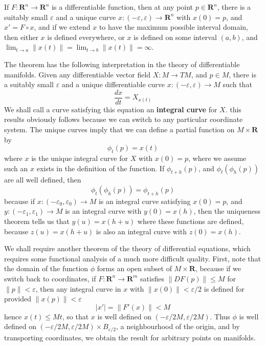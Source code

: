 \begin{theorem}
    If $F: \mathbf{R}^n \to \mathbf{R}^n$ is a differentiable function, then at any point $p \in \mathbf{R}^n$, there is a suitably small $\varepsilon$ and a unique curve $x: (-\varepsilon, \varepsilon) \to \mathbf{R}^n$ with $x(0) = p$, and $x' = F \circ x$, and if we extend $x$ to have the maximum possible interval domain, then either $x$ is defined everywhere, or $x$ is defined on some interval $(a,b)$, and $\lim_{t \to a} \| x(t) \| = \lim_{t \to b} \| x(t) \| = \infty$.
\end{theorem}

The theorem has the following interpretation in the theory of differentiable manifolds. Given any differentiable vector field $X: M \to TM$, and $p \in M$, there is a suitably small $\varepsilon$ and a unique differentiable curve $x: (-\varepsilon,\varepsilon) \to M$ such that
%
\[ \frac{dx}{dt} = X_{x(t)} \]
%
We shall call a curve satisfying this equation an {\bf integral curve} for $X$. this results obviously follows because we can switch to any particular coordinate system. The unique curves imply that we can define a partial function on $M \times \mathbf{R}$ by
%
\[ \phi_t(p) = x(t) \]
%
where $x$ is the unique integral curve for $X$ with $x(0) = p$, where we assume such an $x$ exists in the definition of the function. If $\phi_{t+h}(p)$, and $\phi_t(\phi_h(p))$ are all well defined, then
%
\[ \phi_t(\phi_h(p)) = \phi_{t + h}(p) \]
%
because if $x: (-\varepsilon_0,\varepsilon_0) \to M$ is an integral curve satisfying $x(0) = p$, and $y: (-\varepsilon_1, \varepsilon_1) \to M$ is an integral curve with $y(0) = x(h)$, then the uniqueness theorem tells us that $y(u) = x(h + u)$ where these functions are defined, because $z(u) = x(h + u)$ is also an integral curve with $z(0) = x(h)$.

We shall require another theorem of the theory of differential equations, which requires some functional analysis of a much more difficult quality. First, note that the domain of the function $\phi$ forms an open subset of $M \times \mathbf{R}$, because if we switch back to coordinates, if $F: \mathbf{R}^n \to \mathbf{R}^m$ satisfies $\| DF(p) \| \leq M$ for $\| p \| < \varepsilon$, then any integral curve in $x$ with $\| x(0) \| < \varepsilon/2$ is defined for provided $\| x(p) \| < \varepsilon$
%
\[ |x'| = \| F'(x) \| < M \]
%
hence $x(t) \leq Mt$, so that $x$ is well defined on $(-\varepsilon/2M,\varepsilon/2M)$. Thus $\phi$ is well defined on $(-\varepsilon/2M, \varepsilon/2M) \times B_{\varepsilon/2}$, a neighbourhood of the origin, and by transporting coordinates, we obtain the result for arbitrary points on manifolds. 

